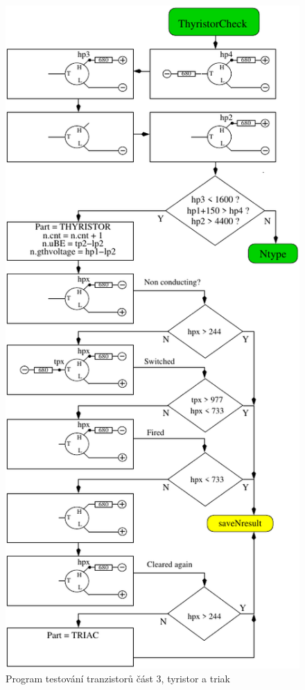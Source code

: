 \begin{figure}[H]
\centering
\includegraphics[]{../FIG/CheckSemi3.pdf}
\caption{Program testování tranzistorů část 3, tyristor a triak}
\label{fig:ChkSemi3}
\end{figure}


